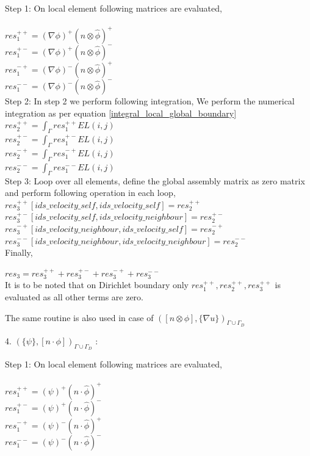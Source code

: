 \documentclass[a4paper]{book}
\begin{document}
Step 1: On local element following matrices are evaluated,\\
\\
$res_1^{++} = (\nabla \phi)^+ (n \otimes \hat{\phi})^+$\\
$res_1^{+-} = (\nabla \phi)^+ (n \otimes \hat{\phi})^-$\\
$res_1^{-+} = (\nabla \phi)^- (n \otimes \hat{\phi})^+$\\
$res_1^{--} = (\nabla \phi)^- (n \otimes \hat{\phi})^-$\\

Step 2: In step 2 we perform following integration, 
We perform the numerical integration as per equation \ref{integral_local_global_boundary}
\\ 
$res_2^{++} = \int_{\Gamma} res_1^{++} EL(i,j)$\\
$res_2^{+-} = \int_{\Gamma} res_1^{+-} EL(i,j)$\\
$res_2^{-+} = \int_{\Gamma} res_1^{-+} EL(i,j)$\\
$res_2^{--} = \int_{\Gamma} res_1^{--} EL(i,j)$\\

Step 3: Loop over all elements, define the global assembly matrix as zero matrix and perform following operation in each loop,
\\
$res_3^{++}[ids\_velocity\_self,ids\_velocity\_self] = res_2^{++}$\\
$res_3^{+-}[ids\_velocity\_self,ids\_velocity\_neighbour] = res_2^{+-}$\\
$res_3^{-+}[ids\_velocity\_neighbour,ids\_velocity\_self] = res_2^{-+}$\\
$res_3^{--}[ids\_velocity\_neighbour,ids\_velocity\_neighbour] = res_2^{--}$\\

Finally,

$res_3 = res_3^{++} + res_3^{+-} + res_3^{-+} + res_3^{--}$\\

It is to be noted that on Dirichlet boundary only $res_1^{++}, res_2^{++}, res_3^{++}$ is evaluated as all other terms are zero.

The same routine is also used in case of $([n \otimes \phi],\lbrace \nabla u \rbrace )_{\Gamma \cup \Gamma_D}$

4. $(\lbrace \psi \rbrace, [n \cdot \phi])_{\Gamma \cup \Gamma_D}$ :

Step 1: On local element following matrices are evaluated,\\
\\
$res_1^{++} = (\psi)^+ (n \cdot \hat{\phi})^+$\\
$res_1^{+-} = (\psi)^+ (n \cdot \hat{\phi})^-$\\
$res_1^{-+} = (\psi)^- (n \cdot \hat{\phi})^+$\\
$res_1^{--} = (\psi)^- (n \cdot \hat{\phi})^-$\\
\end{document}

